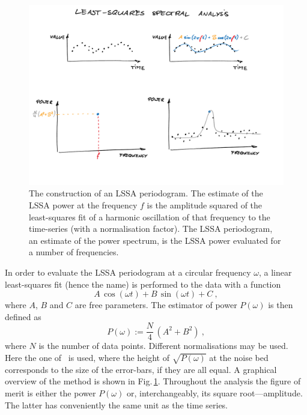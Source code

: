 \begin{figure}
  \centering
  \includegraphics[width=\linewidth]{gfx/axions/LSSA}
  \caption{The construction of an LSSA periodogram.
  The estimate of the LSSA power at the frequency $f$ is the amplitude squared of the least-squares fit of a harmonic oscillation of that frequency to the time-series (with a normalisation factor).
  The LSSA periodogram, an estimate of the power spectrum, is the LSSA power evaluated for a number of frequencies.}\label{fig:LSSA_overview}
\end{figure}

In order to evaluate the LSSA periodogram at a circular frequency $\omega$, a linear least-squares fit (hence the name) is performed to the data with a function
\begin{equation}
  A\,\cos(\omega t) + B\,\sin(\omega t) + C \ ,
\end{equation}
where $A$, $B$ and $C$ are free parameters. The estimator of power $P(\omega)$ is then defined as
\begin{equation}
  P(\omega) := \frac{N}{4} \, \left( A^2 + B^2 \right) \ ,
\end{equation}
where $N$ is the number of data points. Different normalisations may be used.
Here the one of~\cite{Scargle1982} is used, where the height of $\sqrt{P(\omega)}$ at the noise bed corresponds to the size of the error-bars, if they are all equal. A graphical overview of the method is shown in Fig.\,\ref{fig:LSSA_overview}. Throughout the analysis the figure of merit is either the power $P(\omega)$ or, interchangeably, its square root---amplitude. The latter has conveniently the same unit as the time series.

